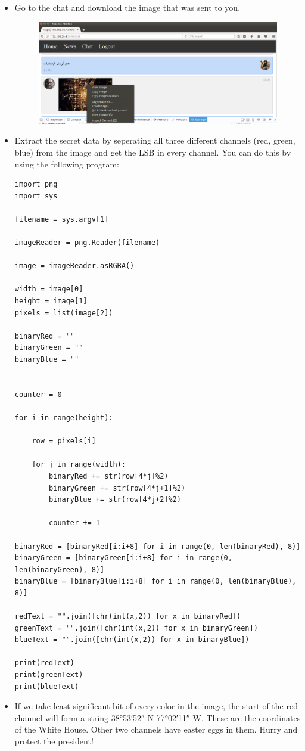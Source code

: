 \documentclass[11pt]{article}
\begin{document}
\begin{itemize}
\item Go to the chat and download the image that was sent to you.
\begin{figure}[H]
    \includegraphics[width=\linewidth]{images/steganography.png}
	\end{figure}
\item Extract the secret data by seperating all three different channels (red, green, blue) from the image and get the LSB in every channel. You can do this by using the following program:

\begin{verbatim}
import png
import sys

filename = sys.argv[1]

imageReader = png.Reader(filename)

image = imageReader.asRGBA()

width = image[0]
height = image[1]
pixels = list(image[2])

binaryRed = ""
binaryGreen = ""
binaryBlue = ""


counter = 0

for i in range(height):

    row = pixels[i]

    for j in range(width):
        binaryRed += str(row[4*j]%2)
        binaryGreen += str(row[4*j+1]%2)
        binaryBlue += str(row[4*j+2]%2)

        counter += 1

binaryRed = [binaryRed[i:i+8] for i in range(0, len(binaryRed), 8)]
binaryGreen = [binaryGreen[i:i+8] for i in range(0, len(binaryGreen), 8)]
binaryBlue = [binaryBlue[i:i+8] for i in range(0, len(binaryBlue), 8)]

redText = "".join([chr(int(x,2)) for x in binaryRed])
greenText = "".join([chr(int(x,2)) for x in binaryGreen])
blueText = "".join([chr(int(x,2)) for x in binaryBlue])

print(redText)
print(greenText)
print(blueText)
\end{verbatim}
\item If we take least significant bit of every color in the image, the start of the red channel will form a string \ang{38;53;52} N \ang{77;02;11} W. These are the coordinates of the White House. Other two channels have easter eggs in them. Hurry and protect the president!
\end{itemize}
\end{document}
